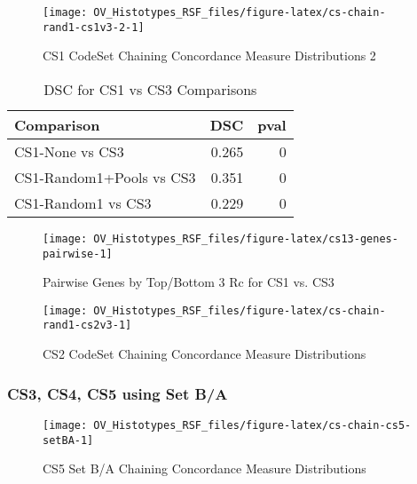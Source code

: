 \documentclass[
]{report}
\begin{document}
\begin{figure}[H]

{\centering \texttt{[image: OV\_Histotypes\_RSF\_files/figure-latex/cs-chain-rand1-cs1v3-2-1]} 

}

\caption{CS1 CodeSet Chaining Concordance Measure Distributions 2}\label{fig:cs-chain-rand1-cs1v3-2}
\end{figure}

\begin{table}

\caption{\label{tab:cs13-dsc}DSC for CS1 vs CS3 Comparisons}
\centering
\begin{tabular}[t]{l|r|r}
\hline
Comparison & DSC & pval\\
\hline
CS1-None vs CS3 & 0.265 & 0\\
\hline
CS1-Random1+Pools vs CS3 & 0.351 & 0\\
\hline
CS1-Random1 vs CS3 & 0.229 & 0\\
\hline
\end{tabular}
\end{table}

\begin{figure}[H]

{\centering \texttt{[image: OV\_Histotypes\_RSF\_files/figure-latex/cs13-genes-pairwise-1]} 

}

\caption{Pairwise Genes by Top/Bottom 3 Rc for CS1 vs. CS3}\label{fig:cs13-genes-pairwise}
\end{figure}

\begin{figure}[H]

{\centering \texttt{[image: OV\_Histotypes\_RSF\_files/figure-latex/cs-chain-rand1-cs2v3-1]} 

}

\caption{CS2 CodeSet Chaining Concordance Measure Distributions}\label{fig:cs-chain-rand1-cs2v3}
\end{figure}

\hypertarget{cs3-cs4-cs5-using-set-ba}{%
\subsubsection{CS3, CS4, CS5 using Set B/A}\label{cs3-cs4-cs5-using-set-ba}}

\begin{figure}[H]

{\centering \texttt{[image: OV\_Histotypes\_RSF\_files/figure-latex/cs-chain-cs5-setBA-1]} 

}

\caption{CS5 Set B/A Chaining Concordance  Measure Distributions}\label{fig:cs-chain-cs5-setBA}
\end{figure}
\end{document}
